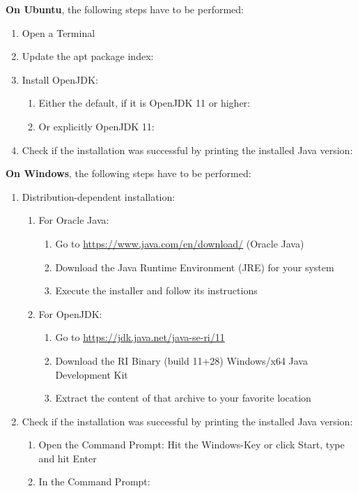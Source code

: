 \textbf{On Ubuntu}, the following steps have to be performed:
\begin{enumerate}
	\item Open a Terminal
	\item Update the apt package index: 
	\item Install OpenJDK:
	\begin{enumerate}
		\item Either the default, if it is OpenJDK 11 or higher: 
		\item Or explicitly OpenJDK 11: 
	\end{enumerate}
	\item Check if the installation was successful by printing the installed Java version: 
\end{enumerate}

\textbf{On Windows}, the following steps have to be performed:
\begin{enumerate}
	\item Distribution-dependent installation:
	\begin{enumerate}
		\item For Oracle Java:
		\begin{enumerate}
			\item Go to \url{https://www.java.com/en/download/} (Oracle Java)
			\item Download the Java Runtime Environment (JRE) for your system
			\item Execute the installer and follow its instructions
		\end{enumerate}
		\item For OpenJDK:
		\begin{enumerate}
			\item Go to \url{https://jdk.java.net/java-se-ri/11}
			\item Download the RI Binary (build 11+28) Windows/x64 Java Development Kit
			\item Extract the content of that archive to your favorite location
		\end{enumerate}
	\end{enumerate}
	\item Check if the installation was successful by printing the installed Java version:
	\begin{enumerate}
		\item Open the Command Prompt: Hit the Windows-Key or click Start, type  and hit Enter
		\item In the Command Prompt: 
	\end{enumerate}
\end{enumerate}